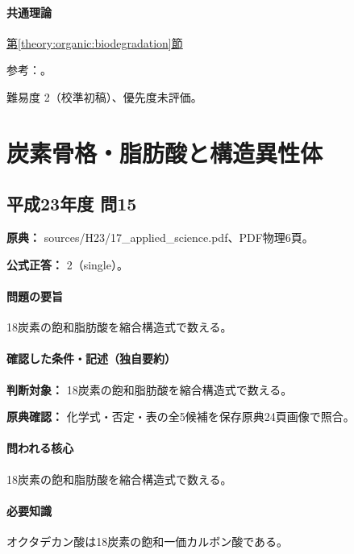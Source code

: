 \paragraph{共通理論} \hyperref[theory:organic:biodegradation]{第\ref*{theory:organic:biodegradation}節}

\par 参考：\cite{organic_jbpa,organic_jbpa_en}。

\par 難易度 2（校準初稿）、優先度未評価。

\section{炭素骨格・脂肪酸と構造異性体}

\subsection{平成23年度 問15}
\label{q:h23-reg-applied-15}

\noindent\textbf{原典：} sources/H23/17\_applied\_science.pdf、PDF物理6頁。

\textbf{公式正答：} 2（single）。

\paragraph{問題の要旨} 18炭素の飽和脂肪酸を縮合構造式で数える。

\paragraph{確認した条件・記述（独自要約）}\mbox{}\par

\noindent\textbf{判断対象：} 18炭素の飽和脂肪酸を縮合構造式で数える。\par

\noindent\textbf{原典確認：} 化学式・否定・表の全5候補を保存原典24頁画像で照合。\par

\paragraph{問われる核心} 18炭素の飽和脂肪酸を縮合構造式で数える。

\paragraph{必要知識} オクタデカン酸は18炭素の飽和一価カルボン酸である。

